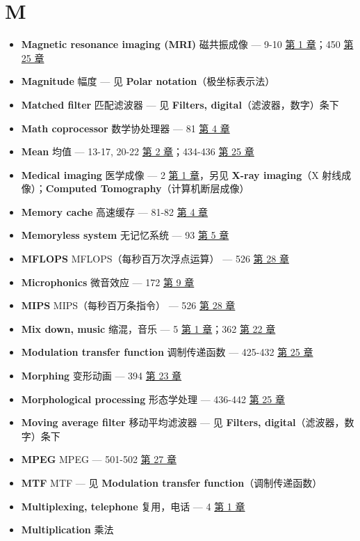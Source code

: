 \section{M}

\begin{itemize}
\tightlist
\item
  \textbf{Magnetic resonance imaging (MRI)} 磁共振成像 --- 9-10
   \hyperref[ch-01]{第 1 章}；450 
  \hyperref[ch-25]{第 25 章}
\item
  \textbf{Magnitude} 幅度 --- 见 \textbf{Polar notation}（极坐标表示法）
\item
  \textbf{Matched filter} 匹配滤波器 --- 见 \textbf{Filters,
  digital}（滤波器，数字）条下
\item
  \textbf{Math coprocessor} 数学协处理器 --- 81 
  \hyperref[ch-04]{第 4 章}
\item
  \textbf{Mean} 均值 --- 13-17, 20-22  \hyperref[ch-02]{第 2
  章}；434-436  \hyperref[ch-25]{第 25 章}
\item
  \textbf{Medical imaging} 医学成像 --- 2  \hyperref[ch-01]{第
  1 章}，另见 \textbf{X-ray imaging}（X 射线成像）；\textbf{Computed
  Tomography}（计算机断层成像）
\item
  \textbf{Memory cache} 高速缓存 --- 81-82 
  \hyperref[ch-04]{第 4 章}
\item
  \textbf{Memoryless system} 无记忆系统 --- 93 
  \hyperref[ch-05]{第 5 章}
\item
  \textbf{MFLOPS} MFLOPS（每秒百万次浮点运算） --- 526 
  \hyperref[ch-28]{第 28 章}
\item
  \textbf{Microphonics} 微音效应 --- 172  \hyperref[ch-09]{第
  9 章}
\item
  \textbf{MIPS} MIPS（每秒百万条指令） --- 526 
  \hyperref[ch-28]{第 28 章}
\item
  \textbf{Mix down, music} 缩混，音乐 --- 5 
  \hyperref[ch-01]{第 1 章}；362  \hyperref[ch-22]{第 22 章}
\item
  \textbf{Modulation transfer function} 调制传递函数 --- 425-432
   \hyperref[ch-25]{第 25 章}
\item
  \textbf{Morphing} 变形动画 --- 394  \hyperref[ch-23]{第 23
  章}
\item
  \textbf{Morphological processing} 形态学处理 --- 436-442 
  \hyperref[ch-25]{第 25 章}
\item
  \textbf{Moving average filter} 移动平均滤波器 --- 见 \textbf{Filters,
  digital}（滤波器，数字）条下
\item
  \textbf{MPEG} MPEG --- 501-502  \hyperref[ch-27]{第 27 章}
\item
  \textbf{MTF} MTF --- 见 \textbf{Modulation transfer
  function}（调制传递函数）
\item
  \textbf{Multiplexing, telephone} 复用，电话 --- 4 
  \hyperref[ch-01]{第 1 章}
\item
  \textbf{Multiplication} 乘法


\end{itemize}
